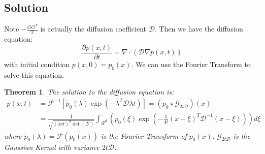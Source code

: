 \documentclass{article}
\newtheorem{theorem}{Theorem}
\begin{document}
\subsection{Solution}
Note $-\frac{GG^T}{2}$ is actually the diffusion coefficient $\mathcal{D}$. Then we have the diffusion equation:
\begin{equation}
    \frac{\partial p(x, t)}{\partial t} = \nabla \cdot\left(\mathcal{D}\nabla p(x, t)\right)
\end{equation}
with initial condition $p(x, 0) = p_0(x)$. We can use the Fourier Transform to solve this equation. 
\begin{theorem}
    The solution to the diffusion equation is:
    \begin{equation}
        \begin{aligned}
            p(x, t) &= \mathscr{F}^{-1}\left[\tilde{p}_0(\lambda)\exp\left(-\lambda^T\mathcal{D}\lambda t\right)\right]=\left(p_0\star \mathcal{G}_{2t\mathcal{D}}\right)(x)\\
            & = \frac{1}{\sqrt{(4\pi t)^d\det(\mathcal{D})}}\int_{\mathcal{R}^d}\left(p_0(\xi)\exp\left(-\frac{1}{4t}\left(x-\xi\right)^T\mathcal{D}^{-1}\left(x-\xi\right)\right)\right)d\xi
        \end{aligned}
    \end{equation}
    where $\tilde{p}_0(\lambda) = \mathscr{F}(p_0(x))$ is the Fourier Transform of $p_0(x)$. $\mathcal{G}_{2t\mathcal{D}}$ is the Gaussian Kernel with variance $2t\mathcal{D}$.
\end{theorem}
\end{document}
